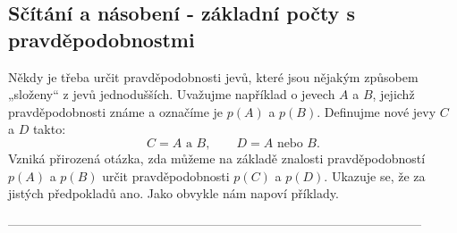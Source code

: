       

      

      

    \subsection{Sčítání a násobení - základní počty s pravděpodobnostmi}
      Někdy je třeba určit pravděpodobnosti jevů, které jsou nějakým způsobem „složeny“ z jevů
      jednodušších. Uvažujme například o jevech \(A\) a \(B\), jejichž pravděpodobnosti známe a 
      označíme je \(p(A)\) a \(p(B)\). Definujme nové jevy \(C\) a \(D\) takto:
      \begin{equation*}
        C = A \text{ a } B, \qquad D = A \text{ nebo } B.
      \end{equation*}
      Vzniká přirozená otázka, zda můžeme na základě znalosti pravděpodobností \(p(A)\) a \(p(B)\) 
      určit pravděpodobnosti \(p(C)\) a \(p(D)\). Ukazuje se, že za jistých předpokladů ano. Jako 
      obvykle nám napoví příklady.
      
---------------------------------------------------------------------------------------------------
\printbibliography[heading=subbibliography]
